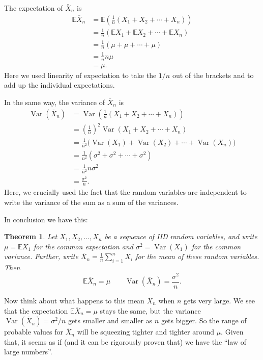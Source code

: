\documentclass[
  a4paper,
]{book}
\newtheorem{theorem}{Theorem}[chapter]
\theoremstyle{definition}
\theoremstyle{definition}
\theoremstyle{definition}
\theoremstyle{definition}
\theoremstyle{remark}
\begin{document}
The expectation of \(\bar X_n\) is
\begin{align*}
\mathbb E \overline X_n &= \mathbb E \left( \frac{1}{n} (X_1 + X_2 + \cdots + X_n)\right) \\
&=   \frac{1}{n} (\mathbb EX_1 + \mathbb EX_2 + \cdots + \mathbb EX_n)\\
&= \frac{1}{n} (\mu + \mu + \cdots + \mu)\\
&= \frac{1}{n} n \mu \\
&= \mu .
\end{align*}
Here we used linearity of expectation to take the \(1/n\) out of the brackets and to add up the individual expectations.

In the same way, the variance of \(\overline X_n\) is
\begin{align*}
\operatorname{Var}( \overline X_n) &= \operatorname{Var}\left( \frac{1}{n} (X_1 + X_2 + \cdots + X_n)\right) \\
&= \left(\frac{1}{n}\right)^2 \operatorname{Var}(X_1 + X_2 + \cdots + X_n) \\
&=   \frac{1}{n^2} \big(\operatorname{Var}(X_1) + \operatorname{Var}(X_2) + \cdots + \operatorname{Var}(X_n)\big)\\
&= \frac{1}{n^2} (\sigma^2 + \sigma^2+ \cdots + \sigma^2)\\
&= \frac{1}{n^2} n \sigma^2 \\
&= \frac{\sigma^2}{n} .
\end{align*}
Here, we crucially used the fact that the random variables are independent to write the variance of the sum as a sum of the variances.

In conclusion we have this:

\begin{theorem}
Let \(X_1, X_2, \dots, X_n\) be a sequence of IID random variables, and write \(\mu = \mathbb EX_1\) for the common expectation and \(\sigma^2 = \operatorname{Var}(X_1)\) for the common variance. Further, write
\(\overline X_n =\frac{1}{n} \sum_{i=1}^n X_i\) for the mean of these random variables. Then
\[ \mathbb E \overline X_n = \mu \qquad \operatorname{Var}(\overline X_n) = \frac{\sigma^2}{n} . \]
\end{theorem}

Now think about what happens to this mean \(\overline X_n\) when \(n\) gets very large. We see that the expectation \(\mathbb E\overline X_n = \mu\) stays the same, but the variance \(\operatorname{Var}(\overline X_n) = \sigma^2/n\) gets smaller and smaller as \(n\) gets bigger. So the range of probable values for \(\overline X_n\) will be squeezing tighter and tighter around \(\mu\). Given that, it seems as if (and it can be rigorously proven that) we have the ``law of large numbers''.
\end{document}

